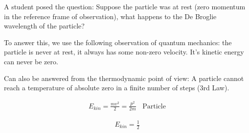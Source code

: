 A student posed the question: Suppose the particle was at rest (zero momentum in the reference frame of observation), what happens to the De Broglie wavelength of the particle?

To answer this, we use the following observation of quantum mechanics: the particle is never at rest, it always has some non-zero velocity. It's kinetic energy can never be zero.

Can also be answered from the thermodynamic point of view: A particle cannot reach a temperature of absolute zero in a finite number of steps (3rd Law).

\begin{align*}
  E_{kin} = \frac{mv^2}{2} = \frac{p^2}{2m}~~~~\text{Particle}
\end{align*}

\begin{align*}
  E_{kin} = \frac{1}{2}
\end{align*}



